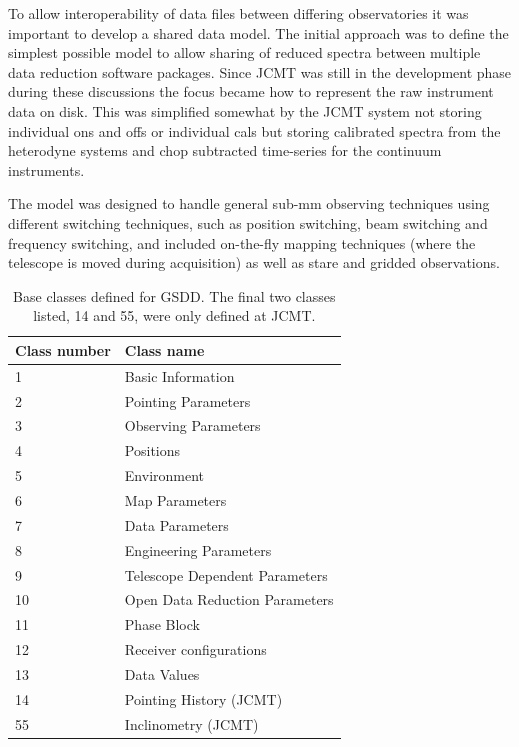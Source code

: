 \documentclass[final,authoryear,5p,times,twocolumn]{elsarticle}
\begin{document}
To allow interoperability of data files between differing
observatories it was important to develop a shared data model. The
initial approach was to define the simplest possible model to allow
sharing of reduced spectra between multiple data reduction software
packages. Since JCMT was still in the development phase during these
discussions the focus became how to represent the raw instrument data
on disk. This was simplified somewhat by the JCMT system not storing
individual ons and offs or individual cals but storing calibrated
spectra from the heterodyne systems and chop subtracted time-series
for the continuum instruments.

The model was designed to handle general sub-mm observing techniques
using different switching techniques, such as position switching, beam
switching and frequency switching, and included on-the-fly mapping
techniques (where the telescope is moved during acquisition) as well
as stare and gridded observations.

\begin{table}
\caption{Base classes defined for GSDD. The final two classes listed,
  14 and 55, were only defined at JCMT.}
\label{tab:classes}
\begin{center}
\begin{tabular}{ll}
\hline
Class number &Class name \\ \hline
1         & Basic Information \\
2         & Pointing Parameters  \\
3         & Observing Parameters \\
4         & Positions \\
5         & Environment \\
6         & Map Parameters \\
7         & Data Parameters \\
8         & Engineering Parameters \\
9         & Telescope Dependent Parameters \\
10        & Open Data Reduction Parameters \\
11        & Phase Block \\
12        & Receiver configurations\\
13        & Data Values \\
14        & Pointing History (JCMT) \\
55        & Inclinometry (JCMT)\\
\hline
\end{tabular}
\end{center}
\end{table}
\end{document}
